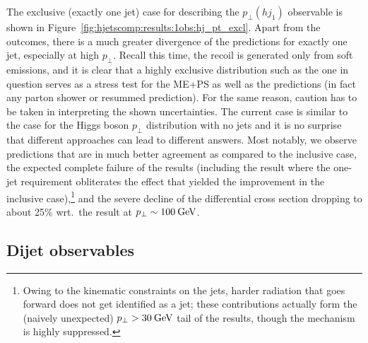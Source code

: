 The exclusive (exactly one jet) case for describing the
$p_\perp(hj_1)$ observable is shown in
Figure~\ref{fig:hjetscomp:results:1obs:hj_pt_excl}. Apart from the
\NNLOPS outcomes, there is a much greater divergence of the
predictions for exactly one jet, especially at high $p_\perp$. Recall
this time, the recoil is generated only from soft emissions, and it is
clear that a highly exclusive distribution such as the one in question
serves as a stress test for the ME+PS as well as the \NNLOPS
predictions (in fact any parton shower or resummed prediction). For
the same reason, caution has to be taken in interpreting the shown
uncertainties. The current case is similar to the case for the Higgs
boson $p_\perp$ distribution with no jets and it is no surprise that
different approaches can lead to different answers. Most notably, we
observe \NNLOPS predictions that are in much better agreement as
compared to the inclusive case, the expected complete failure of the
\GoSam results (including the \Loopsim result where the one-jet
requirement obliterates the effect that yielded the improvement in the
inclusive case),\footnote{Owing to the kinematic constraints on the
  jets, harder radiation that goes forward does not get identified as a
  jet; these contributions actually form the (naively unexpected)
  $p_\perp>30\text{\:GeV}$ tail of the \GoSam results, though the mechanism is
  highly suppressed.}
and the severe decline of the \Herwig differential cross section
dropping to about 25\% wrt.~the \Powheg result at $p_\perp\sim100\text{\:GeV}$.




\subsection{Dijet observables}
\label{sec:hjetscomp:results:2jobs}




